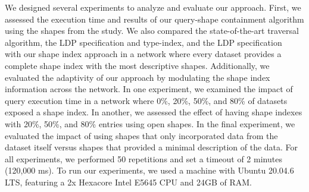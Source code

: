 We designed several experiments to analyze and evaluate our approach.
First, we assessed the execution time and results of our query-shape containment algorithm using the shapes from the study.
We also compared the state-of-the-art traversal algorithm, the LDP specification and type-index, and the LDP specification~\cite{Taelman2023} with our shape index approach in a network where every dataset provides a complete shape index with the most descriptive shapes.
Additionally, we evaluated the adaptivity of our approach by modulating the shape index information across the network.
In one experiment, we examined the impact of query execution time in a network where 0\%, 20\%, 50\%, and 80\% of datasets exposed a shape index.
In another, we assessed the effect of having shape indexes with 20\%, 50\%, and 80\% entries using open shapes.
In the final experiment, we evaluated the impact of using shapes that only incorporated data from the dataset itself versus shapes that provided a minimal description of the data.
For all experiments, we performed 50 repetitions and set a timeout of 2 minutes (120,000 ms).
To run our experiments, we used a machine with Ubuntu 20.04.6 LTS, featuring a 2x Hexacore Intel E5645 CPU and 24GB of RAM.

\iffalse
PROVIDE LINK FOR EXPERIMENTS AND SHAPES

102x pcgen3 nodes
https://doc.ilabt.imec.be/ilabt/virtualwall/hardware.html#virtual-wall-2
\fi
